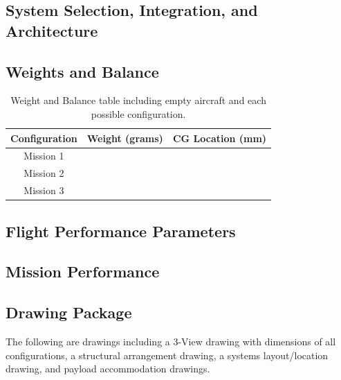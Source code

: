 \documentclass[report]{byu-aero}
\begin{document}
\subsection{System Selection, Integration, and Architecture}
\label{ssec:systemdetails}




\subsection{Weights and Balance}
\label{ssec:weightsandbalance}


\begin{table}[h!]
	\centering
	\caption{Weight and Balance table including empty aircraft and each possible configuration.}
	\label{tab:wieghtsandbalance}
	\begin{tabular}{ |c|c|c| } 
		\hline
		\rowcolor{BYUbluemid}
    	Configuration & Weight (grams) & CG Location (mm) \\ 
		\hline
	    Mission 1 &  &  \\ 
		\hline
		Mission 2 &  &  \\ 
		\hline
		Mission 3 &  &  \\ 
		\hline
	\end{tabular}
\end{table}



\subsection{Flight Performance Parameters}
\label{ssec:flightperformanceparams}




\subsection{Mission Performance}
\label{ssec:missionperformance}



 
\subsection{Drawing Package}
\label{ssec:drawings}

The following are drawings including a 3-View drawing with dimensions of all configurations, a structural arrangement drawing, a systems layout/location drawing, and payload accommodation drawings.
\end{document}
